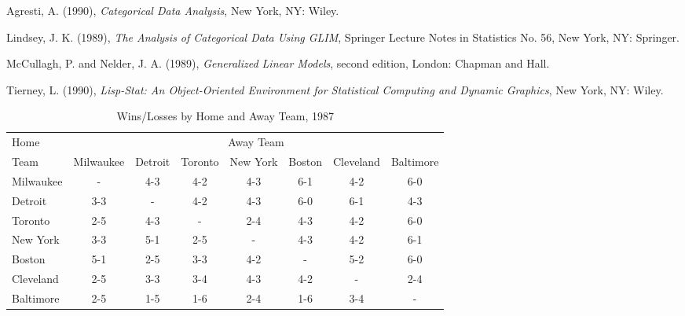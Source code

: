 
\begin{thebibliography}{99}
{\sc Agresti, A.} (1990), {\em Categorical Data Analysis}, New York,
NY: Wiley.

{\sc Lindsey, J. K.} (1989), {\em The Analysis of Categorical Data
Using GLIM}, Springer Lecture Notes in Statistics No.  56, New York,
NY: Springer.

{\sc McCullagh, P. and Nelder, J. A.} (1989), {\em Generalized Linear
Models}, second edition, London: Chapman and Hall.

{\sc Tierney, L.} (1990), {\em Lisp-Stat: An Object-Oriented
Environment for Statistical Computing and Dynamic Graphics}, New York,
NY: Wiley.
\end{thebibliography}





\begin{table}
\caption{Wins/Losses by Home and Away Team, 1987}
\begin{tabular}{lccccccc}
\hline
Home & \multicolumn{7}{c}{Away Team}\\
\cline{2-8}
Team & Milwaukee & Detroit & Toronto & New York & Boston &
Cleveland & Baltimore\\
\hline
Milwaukee &  -  & 4-3 & 4-2 & 4-3 & 6-1 & 4-2 & 6-0\\
Detroit   & 3-3 &  -  & 4-2 & 4-3 & 6-0 & 6-1 & 4-3\\
Toronto   & 2-5 & 4-3 &  -  & 2-4 & 4-3 & 4-2 & 6-0\\
New York  & 3-3 & 5-1 & 2-5 &  -  & 4-3 & 4-2 & 6-1\\
Boston    & 5-1 & 2-5 & 3-3 & 4-2 &  -  & 5-2 & 6-0\\
Cleveland & 2-5 & 3-3 & 3-4 & 4-3 & 4-2 & -   & 2-4\\
Baltimore & 2-5 & 1-5 & 1-6 & 2-4 & 1-6 & 3-4 &  - \\
\hline
\end{tabular}
\end{table}
